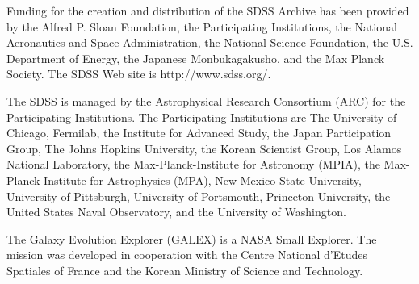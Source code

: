 \documentclass[10pt,preprint]{aastex}
\begin{document}
Funding for the creation and distribution of the SDSS Archive has been
provided by the Alfred P. Sloan Foundation, the Participating
Institutions, the National Aeronautics and Space Administration, the
National Science Foundation, the U.S. Department of Energy, the
Japanese Monbukagakusho, and the Max Planck Society. The SDSS Web site
is http://www.sdss.org/.

The SDSS is managed by the Astrophysical Research Consortium (ARC) for
the Participating Institutions. The Participating Institutions are The
University of Chicago, Fermilab, the Institute for Advanced Study, the
Japan Participation Group, The Johns Hopkins University, the Korean
Scientist Group, Los Alamos National Laboratory, the
Max-Planck-Institute for Astronomy (MPIA), the Max-Planck-Institute
for Astrophysics (MPA), New Mexico State University, University of
Pittsburgh, University of Portsmouth, Princeton University, the United
States Naval Observatory, and the University of Washington.

The Galaxy Evolution Explorer (GALEX) is a NASA Small Explorer. The
mission was developed in cooperation with the Centre National d'Etudes
Spatiales of France and the Korean Ministry of Science and Technology.




\newpage

%

\newpage
%
\end{document}
